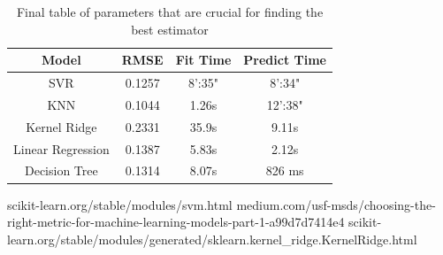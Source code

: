 \documentclass[a4paper,12pt]{article}
\begin{document}
\begin{table}[]
    \centering
\begin{tabular}{ c | c | c | c }
 Model & RMSE & Fit Time & Predict Time \\ 
 \hline
 SVR & 0.1257 & 8':35" & 8':34" \\  
 \hline
 KNN & 0.1044 & 1.26s & 12':38"\\
 \hline
 Kernel Ridge & 0.2331 & 35.9s & 9.11s\\
 \hline
 Linear Regression & 0.1387 & 5.83s & 2.12s\\
 \hline
 Decision Tree & 0.1314 & 8.07s & 826 ms
\end{tabular}
\caption{Final table of parameters that are crucial for finding the best estimator}
\label{table:final}
\end{table}


\begin{thebibliography}{99}
scikit-learn.org/stable/modules/svm.html
medium.com/usf-msds/choosing-the-right-metric-for-machine-learning-models-part-1-a99d7d7414e4
scikit-learn.org/stable/modules/generated/sklearn.kernel\_ridge.KernelRidge.html
\end{thebibliography}
\end{document}
